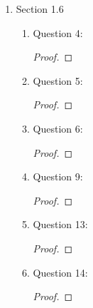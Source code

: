 \documentclass{article}
\begin{document}
\begin{enumerate}
\begin{proof}
      Replacing each element in $Q_8$ by its numbering, we get the
      following table:

      \begin{center}
        \begin{tabular}{|l||l|}
          \hline
          $1$   & $()$ \\ \hline
          $2$   & $(1,2,3,3)\circ(5,6,7,8)$ \\ \hline
          $3$   & $(1,3)\circ(2,4)\circ(5,7)\circ(6,8)$ \\ \hline
          $4$   & $(1,4,3,2)\circ(5,8,7,6)$ \\ \hline
          $5$   & $(1,5,3,7)\circ(2,8,4,6)$ \\ \hline
          $6$   & $(1,6,3,8)\circ(2,5,4,7)$ \\ \hline
          $7$   & $(1,7,3,5)\circ(2,6,4,8)$ \\ \hline
          $8$   & $(1,8,3,6)\circ(2,7,4,5)$ \\ \hline
        \end{tabular}
      \end{center}
    \end{proof}

  \item Section 1.6
    \begin{enumerate}
      \item Question 4:
        \begin{proof}
        \end{proof}

      \item Question 5:
        \begin{proof}
        \end{proof}

      \item Question 6:
        \begin{proof}
        \end{proof}

      \item Question 9:
        \begin{proof}
        \end{proof}

      \item Question 13:
        \begin{proof}
        \end{proof}

      \item Question 14:
        \begin{proof}
        \end{proof}


\end{enumerate}
\end{enumerate}
\end{document}

